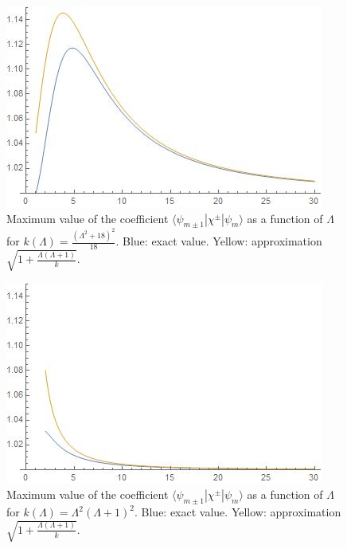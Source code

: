 \begin{figure}[h]
    \centering
    \includegraphics[width = 2\textwidth/3]{images/divFactorwMinimumK.jpg}
    \caption{Maximum value of the coefficient $\langle \psi_{m \pm 1} |\chi^\pm | \psi_{m}\rangle$ as a function of $\Lambda$ for $k(\Lambda) = \frac{(\Lambda^2 + 18)^2}{18}$. Blue: exact value. Yellow: approximation $\sqrt{1 + \frac{\Lambda(\Lambda+1)}{k}}$.}
    \label{fig:figureabnChiMinK}
\end{figure}

\begin{figure}[h]
    \centering
    \includegraphics[width = 2\textwidth/3]{images/divFactorwRecommendedK.jpg}
    \caption{Maximum value of the coefficient $\langle \psi_{m \pm 1} |\chi^\pm | \psi_{m}\rangle$ as a function of $\Lambda$ for $k(\Lambda) = \Lambda^2(\Lambda+1)^2$. Blue: exact value. Yellow: approximation $\sqrt{1 + \frac{\Lambda(\Lambda+1)}{k}}$.}
    \label{fig:figureabnChiRecommendedK}
\end{figure}

